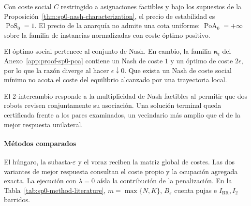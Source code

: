 \begin{corolario}
\label{cor:sp0-pos-poa}
Con coste social $C$ restringido a asignaciones factibles y bajo los supuestos de
la Proposición~\ref{thm:sp0-nash-characterization}, el precio de estabilidad es
$\operatorname{PoS}_0=1$. El precio de la anarquía no admite una cota uniforme:
$\operatorname{PoA}_0=+\infty$ sobre la familia de instancias normalizadas con
coste óptimo positivo.
\end{corolario}
El óptimo social pertenece al conjunto de Nash. En cambio, la familia
$\boldsymbol\kappa_\epsilon$ del Anexo~\ref{app:proof-sp0-poa} contiene un Nash
de coste $1$ y un óptimo de coste $2\epsilon$, por lo que la razón diverge al
hacer $\epsilon\downarrow0$. Que exista un Nash de coste social mínimo no acota
el coste del equilibrio alcanzado por una trayectoria local.

El 2-intercambio responde a la multiplicidad de Nash factibles al permitir que dos robots revisen conjuntamente su asociación. Una solución terminal queda certificada frente a los pares examinados, un vecindario más amplio que el de la mejor respuesta unilateral.

\paragraph{Métodos comparados}

El húngaro, la subasta-\(\varepsilon\) y el voraz reciben la matriz global de costes. Las dos variantes de mejor respuesta consultan el coste propio y la ocupación agregada exacta. La ejecución con \(\lambda=0\) aísla la contribución de la penalización. En la Tabla~\ref{tab:sp0-method-literature}, \(m=\max\{N,K\}\), \(B_\varepsilon\) cuenta pujas e \(I_{\mathrm{BR}},I_2\) barridos.


